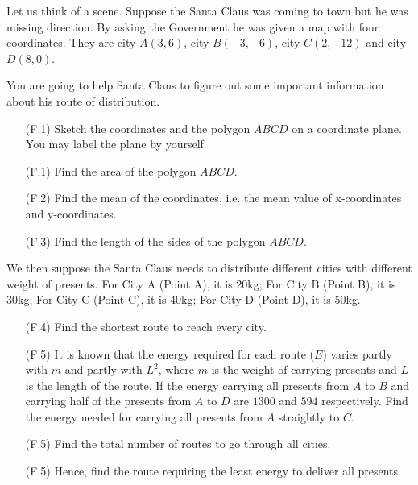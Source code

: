 \documentclass[12pt]{article}
\begin{document}
    Let us think of a scene. Suppose the Santa Claus was coming to town but he was missing direction. By asking the Government he was given a map with four coordinates. They are city $A(3,6)$, city $B(-3,-6)$, city $C(2,-12)$ and city $D(8,0)$.

    You are going to help Santa Claus to figure out some important information about his route of distribution.

    \begin{enumerate}
        \item[(F.1)] Sketch the coordinates and the polygon $ABCD$ on a coordinate plane. You may label the plane by yourself.
        \item[(F.1)] Find the area of the polygon $ABCD$.
        \item[(F.2)] Find the mean of the coordinates, i.e. the mean value of x-coordinates and y-coordinates.
        \item[(F.3)] Find the length of the sides of the polygon $ABCD$.
    \end{enumerate}

    We then suppose the Santa Claus needs to distribute different cities with different weight of presents. For City A (Point A), it is 20kg; For City B (Point B), it is 30kg; For City C (Point C), it is 40kg; For City D (Point D), it is 50kg.

    \begin{enumerate}
        \item[(F.4)] Find the shortest route to reach every city.
        \item[(F.5)] It is known that the energy required for each route ($E$) varies partly with $m$ and partly with $L^2$, where $m$ is the weight of carrying presents and $L$ is the length of the route. If the energy carrying all presents from $A$ to $B$ and carrying half of the presents from $A$ to $D$ are $1300$ and $594$ respectively. Find the energy needed for carrying all presents from $A$ straightly to $C$.
        \item[(F.5)] Find the total number of routes to go through all cities. 
        \item[(F.5)] Hence, find the route requiring the least energy to deliver all presents.
    \end{enumerate}
\end{document}
